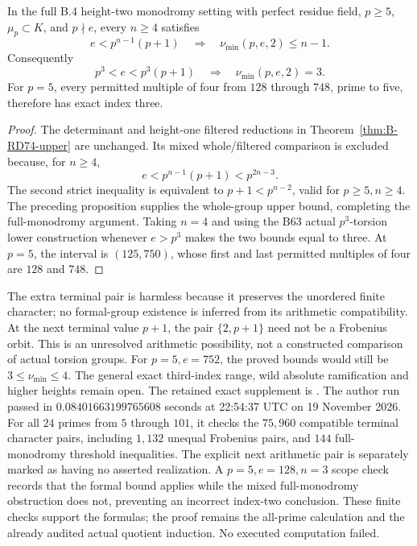 \begin{theorem}
\label{thm:B-RD75}
In the full B.4 height-two monodromy setting with perfect
residue field, \(p\ge5\), \(\mu_p\subset K\), and \(p\nmid e\),
every \(n\ge4\) satisfies
\[
 e<p^{n-1}(p+1)\quad\Longrightarrow\quad
 \nu_{\min}(p,e,2)\le n-1.
 \tag{B-RD75.5}
\]
Consequently
\[
 p^3<e<p^3(p+1)\quad\Longrightarrow\quad
 \boxed{\nu_{\min}(p,e,2)=3}.
 \tag{B-RD75.6}
\]
For \(p=5\), every permitted multiple of four from \(128\)
through \(748\), prime to five, therefore has exact index three.
\end{theorem}
\begin{proof}
The determinant and height-one filtered reductions in
Theorem~\ref{thm:B-RD74-upper} are unchanged. Its mixed
whole/filtered comparison is excluded because, for \(n\ge4\),
\[
 e<p^{n-1}(p+1)<p^{2n-3}.
 \tag{B-RD75.7}
\]
The second strict inequality is equivalent to
\(p+1<p^{n-2}\), valid for \(p\ge5,n\ge4\).
The preceding proposition supplies the whole-group upper
bound, completing the full-monodromy argument.
Taking \(n=4\) and using the B63 actual \(p^3\)-torsion
lower construction whenever \(e>p^3\) makes the two bounds
equal to three. At \(p=5\), the interval is \((125,750)\),
whose first and last permitted multiples of four are \(128\)
and \(748\).
\end{proof}

\begin{remark}
\label{rem:B-RD75-scope}
The extra terminal pair is harmless because it preserves the
unordered finite character; no formal-group existence is
inferred from its arithmetic compatibility. At the next
terminal value \(p+1\), the pair \(\{2,p+1\}\) need not be
a Frobenius orbit. This is an unresolved arithmetic possibility,
not a constructed comparison of actual torsion groups.
For \(p=5,e=752\), the proved bounds would still be
\(3\le\nu_{\min}\le4\). The general exact third-index range,
wild absolute ramification and higher heights remain open.
The retained exact supplement is
.
The author run passed in \(0.08401663199765608\) seconds
at 22:54:37 UTC on 19 November 2026. For all \(24\) primes
from \(5\) through \(101\), it checks the \(75{,}960\)
compatible terminal character pairs, including \(1{,}132\)
unequal Frobenius pairs, and \(144\) full-monodromy threshold
inequalities. The explicit next arithmetic pair is separately
marked as having no asserted realization. A \(p=5,e=128,n=3\)
scope check records that the formal bound applies while the
mixed full-monodromy obstruction does not, preventing an
incorrect index-two conclusion. These finite checks support
the formulas; the proof remains the all-prime calculation
and the already audited actual quotient induction. No
executed computation failed.
\end{remark}
